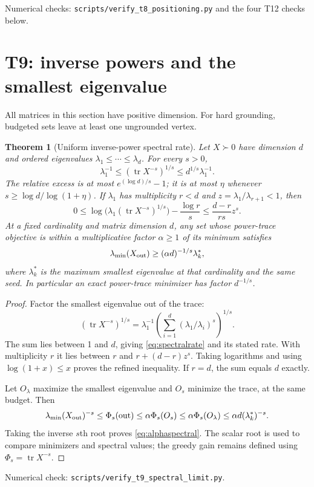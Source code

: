 \documentclass[11pt]{article}
\newtheorem{theorem}{Theorem}
\DeclareMathOperator{\tr}{tr}
\begin{document}
\noindent Numerical checks: \texttt{scripts/verify\_t8\_positioning.py}
and the four T12 checks below.

\section{T9: inverse powers and the smallest eigenvalue}
All matrices in this section have positive dimension. For hard
grounding, budgeted sets leave at least one ungrounded vertex.

\begin{theorem}[Uniform inverse-power spectral rate]\label{thm:spectralrate}
Let $X\succ0$ have dimension $d$ and ordered eigenvalues
$\lambda_1\leq\cdots\leq\lambda_d$. For every $s>0$,
\begin{equation}\label{eq:spectralrate}
 \lambda_1^{-1}\leq(\tr X^{-s})^{1/s}
          \leq d^{1/s}\lambda_1^{-1}.
\end{equation}
The relative excess is at most $e^{(\log d)/s}-1$; it is at most
$\eta$ whenever $s\geq\log d/\log(1+\eta)$.
If $\lambda_1$ has multiplicity $r<d$ and
$z=\lambda_1/\lambda_{r+1}<1$, then
\[
 0\leq\log\bigl(\lambda_1(\tr X^{-s})^{1/s}\bigr)
           -\frac{\log r}{s}
 \leq\frac{d-r}{rs}z^s.
\]
At a fixed cardinality and matrix dimension $d$, any set whose
power-trace objective is within a multiplicative factor $\alpha\geq1$
of its minimum satisfies
\begin{equation}\label{eq:alphaspectral}
 \lambda_{\min}(X_{\rm out})
     \geq(\alpha d)^{-1/s}\lambda_k^*,
\end{equation}
where $\lambda_k^*$ is the maximum smallest eigenvalue at that
cardinality and the same seed. In particular an exact power-trace
minimizer has factor $d^{-1/s}$.
\end{theorem}
\begin{proof}
Factor the smallest eigenvalue out of the trace:
\[
 (\tr X^{-s})^{1/s}
 =\lambda_1^{-1}
    \left(\sum_{i=1}^d(\lambda_1/\lambda_i)^s\right)^{1/s}.
\]
The sum lies between 1 and $d$, giving \eqref{eq:spectralrate}
and its stated rate. With multiplicity $r$ it lies between $r$
and $r+(d-r)z^s$. Taking logarithms and using
$\log(1+x)\leq x$ proves the refined inequality. If $r=d$, the
sum equals $d$ exactly.

Let $O_\lambda$ maximize the smallest eigenvalue and $O_s$ minimize
the trace, at the same budget. Then
\[
 \lambda_{\min}(X_{\rm out})^{-s}
 \leq\Phi_s({\rm out})\leq\alpha\Phi_s(O_s)
 \leq\alpha\Phi_s(O_\lambda)\leq\alpha d(\lambda_k^*)^{-s}.
\]
Taking the inverse $s$th root proves \eqref{eq:alphaspectral}.
The scalar root is used to compare minimizers and spectral values;
the greedy gain remains defined using $\Phi_s=\tr X^{-s}$.
\end{proof}
\noindent Numerical check: \texttt{scripts/verify\_t9\_spectral\_limit.py}.
\end{document}
